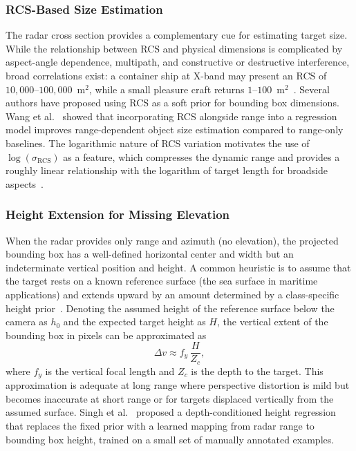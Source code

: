 \subsubsection{RCS-Based Size Estimation}

The radar cross section provides a complementary cue for estimating target size. While the relationship between RCS and physical dimensions is complicated by aspect-angle dependence, multipath, and constructive or destructive interference, broad correlations exist: a container ship at X-band may present an RCS of $10{,}000$--$100{,}000$~m$^2$, while a small pleasure craft returns $1$--$100$~m$^2$~\cite{Skolnik2008}. Several authors have proposed using RCS as a soft prior for bounding box dimensions. Wang et al.~\cite{wang2021rodnet} showed that incorporating RCS alongside range into a regression model improves range-dependent object size estimation compared to range-only baselines. The logarithmic nature of RCS variation motivates the use of $\log(\sigma_{\text{RCS}})$ as a feature, which compresses the dynamic range and provides a roughly linear relationship with the logarithm of target length for broadside aspects~\cite{Skolnik2008}.

\subsubsection{Height Extension for Missing Elevation}

When the radar provides only range and azimuth (no elevation), the projected bounding box has a well-defined horizontal center and width but an indeterminate vertical position and height. A common heuristic is to assume that the target rests on a known reference surface (the sea surface in maritime applications) and extends upward by an amount determined by a class-specific height prior~\cite{nabati2019rrpn}. Denoting the assumed height of the reference surface below the camera as $h_0$ and the expected target height as $H$, the vertical extent of the bounding box in pixels can be approximated as
\begin{equation}\label{eq:height_bbox}
  \Delta v \approx f_y \,\frac{H}{Z_c},
\end{equation}
where $f_y$ is the vertical focal length and $Z_c$ is the depth to the target. This approximation is adequate at long range where perspective distortion is mild but becomes inaccurate at short range or for targets displaced vertically from the assumed surface. Singh et al.~\cite{singh2023depth} proposed a depth-conditioned height regression that replaces the fixed prior with a learned mapping from radar range to bounding box height, trained on a small set of manually annotated examples.

